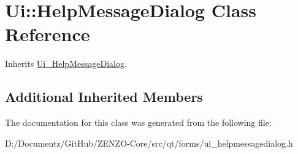 \hypertarget{class_ui_1_1_help_message_dialog}{}\section{Ui\+::Help\+Message\+Dialog Class Reference}
\label{class_ui_1_1_help_message_dialog}


Inherits \mbox{\hyperlink{class_ui___help_message_dialog}{Ui\+\_\+\+Help\+Message\+Dialog}}.

\subsection*{Additional Inherited Members}


The documentation for this class was generated from the following file\+:\begin{DoxyCompactItemize}
\item 
D\+:/\+Documentz/\+Git\+Hub/\+Z\+E\+N\+Z\+O-\/\+Core/src/qt/forms/ui\+\_\+helpmessagedialog.\+h\end{DoxyCompactItemize}
